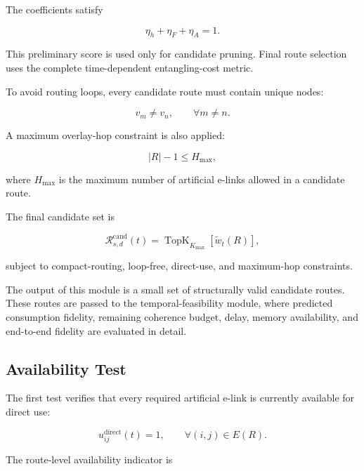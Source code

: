 The coefficients satisfy

\begin{equation}
    \eta_h+\eta_F+\eta_A=1.
\end{equation}

This preliminary score is used only for candidate pruning. Final route selection uses the complete time-dependent entangling-cost metric.

To avoid routing loops, every candidate route must contain unique nodes:

\begin{equation}
    v_m
    \neq
    v_n,
    \qquad
    \forall m\neq n .
\end{equation}

A maximum overlay-hop constraint is also applied:

\begin{equation}
    |R|-1
    \leq
    H_{\max},
\end{equation}

where $H_{\max}$ is the maximum number of artificial e-links allowed in a candidate route.

The final candidate set is

\begin{equation}
    \mathcal{R}_{s,d}^{\mathrm{cand}}(t)
    =
    \operatorname{TopK}_{K_{\max}}
    \left[
    \widetilde{w}_t(R)
    \right],
\end{equation}

subject to compact-routing, loop-free, direct-use, and maximum-hop constraints.

The output of this module is a small set of structurally valid candidate routes. These routes are passed to the temporal-feasibility module, where predicted consumption fidelity, remaining coherence budget, delay, memory availability, and end-to-end fidelity are evaluated in detail.

\subsection{Availability Test}

The first test verifies that every required artificial e-link is currently available for direct use:

\begin{equation}
    u_{ij}^{\mathrm{direct}}(t)
    =
    1,
    \qquad
    \forall (i,j)
    \in
    E(R).
\end{equation}

The route-level availability indicator is

